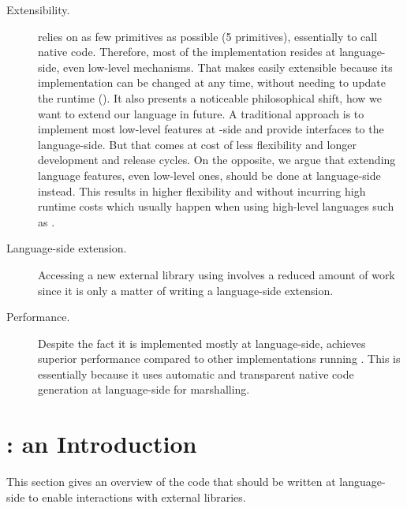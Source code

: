 \begin{description}
	\item[Extensibility.] \NBFFI relies on as few \VM primitives as possible (5 primitives), essentially to call native code. 
	Therefore, most of the implementation resides at language-side, even low-level mechanisms.
	That makes \NBFFI easily extensible because its implementation can be changed at any time, without needing to update the runtime (\VM).
	It also presents a noticeable philosophical shift, how we want to extend our language in future.
	A traditional approach is to implement most low-level features at \VM-side and provide interfaces to the language-side.
	But that comes at cost of less flexibility and longer development and release cycles.
	On the opposite, we argue that extending language features, even low-level ones, should be done at language-side instead.
	This results in higher flexibility and without incurring high runtime costs which usually happen when using high-level languages such as \ST.
	\item[Language-side extension.] Accessing a new external library using \NBFFI involves a reduced amount of work since it is only a matter of writing a language-side extension.
	\item[Performance.] Despite the fact it is implemented mostly at language-side, \NBFFI achieves superior performance compared to other \FFI implementations running \PH.
    This is essentially because it uses automatic and transparent native code generation at language-side for marshalling.
\end{description}



\section{\NBFFI: an Introduction}

This section gives an overview of the code that should be written at language-side
to enable interactions with external libraries.


